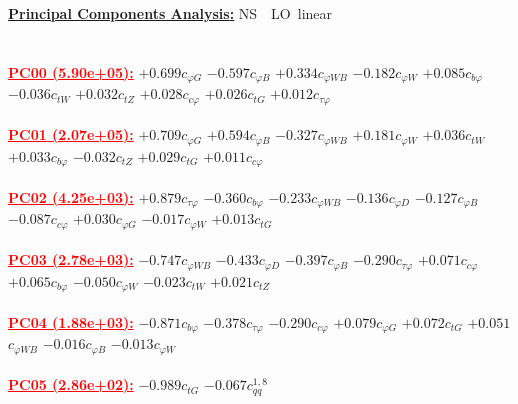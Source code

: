 \documentclass{article}
\begin{document}
\noindent \underline{\bf{Principal Components Analysis}:} \rm NS\ \ LO\ linear\\ \\ \\
\noindent \textcolor{red}{\underline{\bf{PC00} (5.90e+05):}}
{$+0.699$}{\rm $c_{\varphi G}$} 
{$-0.597$}{\rm $c_{\varphi B}$} 
{$+0.334$}{\rm $c_{\varphi WB}$} 
{$-0.182$}{\rm $c_{\varphi W}$} 
{$+0.085$}{\rm $c_{b \varphi}$} 
{$-0.036$}{\rm $c_{tW}$} 
{$+0.032$}{\rm $c_{tZ}$} 
{$+0.028$}{\rm $c_{c \varphi}$} 
{$+0.026$}{\rm $c_{tG}$} 
{$+0.012$}{\rm $c_{\tau \varphi}$} 
 \nonumber \\ \nonumber \\ 
\noindent \textcolor{red}{\underline{\bf{PC01} (2.07e+05):}}
{$+0.709$}{\rm $c_{\varphi G}$} 
{$+0.594$}{\rm $c_{\varphi B}$} 
{$-0.327$}{\rm $c_{\varphi WB}$} 
{$+0.181$}{\rm $c_{\varphi W}$} 
{$+0.036$}{\rm $c_{tW}$} 
{$+0.033$}{\rm $c_{b \varphi}$} 
{$-0.032$}{\rm $c_{tZ}$} 
{$+0.029$}{\rm $c_{tG}$} 
{$+0.011$}{\rm $c_{c \varphi}$} 
 \nonumber \\ \nonumber \\ 
\noindent \textcolor{red}{\underline{\bf{PC02} (4.25e+03):}}
{$+0.879$}{\rm $c_{\tau \varphi}$} 
{$-0.360$}{\rm $c_{b \varphi}$} 
{$-0.233$}{\rm $c_{\varphi WB}$} 
{$-0.136$}{\rm $c_{\varphi D}$} 
{$-0.127$}{\rm $c_{\varphi B}$} 
{$-0.087$}{\rm $c_{c \varphi}$} 
{$+0.030$}{\rm $c_{\varphi G}$} 
{$-0.017$}{\rm $c_{\varphi W}$} 
{$+0.013$}{\rm $c_{tG}$} 
 \nonumber \\ \nonumber \\ 
\noindent \textcolor{red}{\underline{\bf{PC03} (2.78e+03):}}
{$-0.747$}{\rm $c_{\varphi WB}$} 
{$-0.433$}{\rm $c_{\varphi D}$} 
{$-0.397$}{\rm $c_{\varphi B}$} 
{$-0.290$}{\rm $c_{\tau \varphi}$} 
{$+0.071$}{\rm $c_{c \varphi}$} 
{$+0.065$}{\rm $c_{b \varphi}$} 
{$-0.050$}{\rm $c_{\varphi W}$} 
{$-0.023$}{\rm $c_{tW}$} 
{$+0.021$}{\rm $c_{tZ}$} 
 \nonumber \\ \nonumber \\ 
\noindent \textcolor{red}{\underline{\bf{PC04} (1.88e+03):}}
{$-0.871$}{\rm $c_{b \varphi}$} 
{$-0.378$}{\rm $c_{\tau \varphi}$} 
{$-0.290$}{\rm $c_{c \varphi}$} 
{$+0.079$}{\rm $c_{\varphi G}$} 
{$+0.072$}{\rm $c_{tG}$} 
{$+0.051$}{\rm $c_{\varphi WB}$} 
{$-0.016$}{\rm $c_{\varphi B}$} 
{$-0.013$}{\rm $c_{\varphi W}$} 
 \nonumber \\ \nonumber \\ 
\noindent \textcolor{red}{\underline{\bf{PC05} (2.86e+02):}}
{$-0.989$}{\rm $c_{tG}$} 
{$-0.067$}{\rm $c_{qq}^{1,8}$} 
\end{document}
